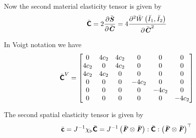 Now the second material elasticity tensor is given by
\begin{equation}
  \bar{\boldsymbol{\mathsf{C}}}=2 \dfrac{\partial \bar{\boldsymbol{\mathit{S}}}}{\partial \bar{\boldsymbol{\mathit{C}}}} =4 \dfrac{\partial^{2}  \bar{W}\left( \bar{I}_{1},\bar{I}_{2} \right) }{\partial {\bar{\ensuremath{\boldsymbol{\mathit{C}}}}}^{2}} 
\end{equation}

In Voigt notation we have
\begin{equation}
  \bar{\boldsymbol{\mathsf{C}}}^{V}=\begin{bmatrix}
  0 & 4c_{2} & 4c_{2} & 0 & 0 & 0 \\
  4c_{2} & 0 & 4c_{2} & 0 & 0 & 0 \\
  4c_{2} & 4c_{2} & 0 & 0 & 0 & 0 \\
  0     & 0      & 0 & -4c_{2} & 0 & 0 \\
  0     & 0      & 0 & 0      & -4c_{2} & 0 \\
  0     & 0      & 0 & 0      & 0      & -4c_{2} 
  \end{bmatrix}
\end{equation}

The second spatial elasticity tensor is given by
\begin{equation}
  \bar{\boldsymbol{\mathsf{c}}}={J}^{-1} \chi_{\triangleright}\bar{\boldsymbol{\mathsf{C}}} ={J}^{-1} \left(  \bar{\boldsymbol{\mathit{F}}} \otimes \bar{\boldsymbol{\mathit{F}}}  \right) : \bar{\boldsymbol{\mathsf{C}}} :  {\left(  \bar{\boldsymbol{\mathit{F}}} \otimes \bar{\boldsymbol{\mathit{F}}}  \right)}^{ \top }  
\end{equation}

